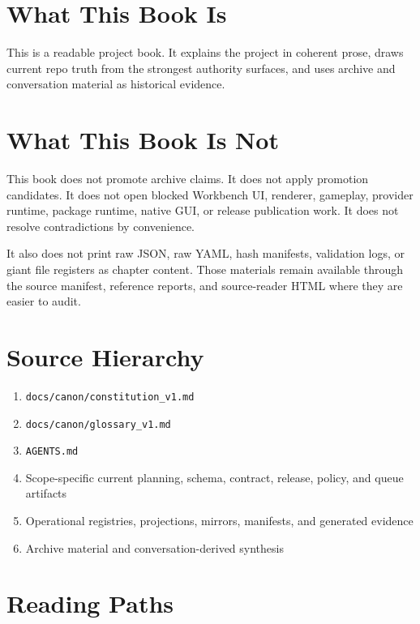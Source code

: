 \documentclass[10.5pt,a4paper,openany]{book}
\begin{document}
\section{What This Book Is}

This is a readable project book.\allowbreak{} It explains the project in coherent prose, draws current repo truth from the strongest authority surfaces, and uses archive and conversation material as historical evidence.\allowbreak{}


\section{What This Book Is Not}

This book does not promote archive claims.\allowbreak{} It does not apply promotion candidates.\allowbreak{} It does not open blocked Workbench UI, renderer, gameplay, provider runtime, package runtime, native GUI, or release publication work.\allowbreak{} It does not resolve contradictions by convenience.\allowbreak{}


It also does not print raw JSON, raw YAML, hash manifests, validation logs, or giant file registers as chapter content.\allowbreak{} Those materials remain available through the source manifest, reference reports, and source-\allowbreak{}reader HTML where they are easier to audit.\allowbreak{}


\section{Source Hierarchy}

\begin{enumerate}
\item \texttt{docs/\allowbreak{}canon/\allowbreak{}constitution\_\allowbreak{}v1.\allowbreak{}md}
\item \texttt{docs/\allowbreak{}canon/\allowbreak{}glossary\_\allowbreak{}v1.\allowbreak{}md}
\item \texttt{AGENTS.\allowbreak{}md}
\item Scope-\allowbreak{}specific current planning, schema, contract, release, policy, and queue artifacts
\item Operational registries, projections, mirrors, manifests, and generated evidence
\item Archive material and conversation-\allowbreak{}derived synthesis
\end{enumerate}

\section{Reading Paths}
\end{document}
